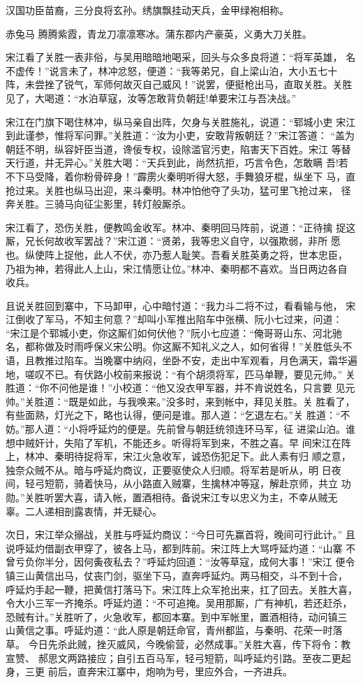 汉国功臣苗裔，三分良将玄孙。绣旗飘挂动天兵，金甲绿袍相称。

赤兔马
腾腾紫霞，青龙刀凛凛寒冰。蒲东郡内产豪英，义勇大刀关胜。

宋江看了关胜一表非俗，与吴用暗暗地喝采，回头与众多良将道：“将军英雄，
名不虚传！”说言未了，林冲忿怒，便道：“我等弟兄，自上梁山泊，大小五七十
阵，未尝挫了锐气，军师何故灭自己威风！”说罢，便挺枪出马，直取关胜。关胜
见了，大喝道：“水泊草寇，汝等怎敢背负朝廷!单要宋江与吾决战。”

宋江在门旗下喝住林冲，纵马亲自出阵，欠身与关胜施礼，说道：“郓城小吏
宋江到此谨参，惟将军问罪。”关胜道：“汝为小吏，安敢背叛朝廷？”宋江答道：
“盖为朝廷不明，纵容奸臣当道，谗佞专权，设除滥官污吏，陷害天下百姓。宋江
等替天行道，并无异心。”关胜大喝：“天兵到此，尚然抗拒，巧言令色，怎敢瞒
吾!若不下马受降，着你粉骨碎身！”霹雳火秦明听得大怒，手舞狼牙棍，纵坐下
马，直抢过来。关胜也纵马出迎，来斗秦明。林冲怕他夺了头功，猛可里飞抢过来，
径奔关胜。三骑马向征尘影里，转灯般厮杀。

宋江看了，恐伤关胜，便教鸣金收军。林冲、秦明回马阵前，说道：“正待擒
捉这厮，兄长何故收军罢战？”宋江道：“贤弟，我等忠义自守，以强欺弱，非所
愿也。纵使阵上捉他，此人不伏，亦乃惹人耻笑。吾看关胜英勇之将，世本忠臣，
乃祖为神，若得此人上山，宋江情愿让位。”林冲、秦明都不喜欢。当日两边各自
收兵。

且说关胜回到寨中，下马卸甲，心中暗忖道：“我力斗二将不过，看看输与他，
宋江倒收了军马，不知主何意？”却叫小军推出陷车中张横、阮小七过来，问道：
“宋江是个郓城小吏，你这厮们如何伏他？”阮小七应道：“俺哥哥山东、河北驰
名，都称做及时雨呼保义宋公明。你这厮不知礼义之人，如何省得！”关胜低头不
语，且教推过陷车。当晚寨中纳闷，坐卧不安，走出中军观看，月色满天，霜华遍
地，嗟叹不已。有伏路小校前来报说：“有个胡须将军，匹马单鞭，要见元帅。”
关胜道：“你不问他是谁！”小校道：“他又没衣甲军器，并不肯说姓名，只言要
见元帅。”关胜道：“既是如此，与我唤来。”没多时，来到帐中，拜见关胜。关
胜看了，有些面熟，灯光之下，略也认得，便问是谁。那人道：“乞退左右。”关
胜道：“不妨。”那人道：“小将呼延灼的便是。先前曾与朝廷统领连环马军，征
进梁山泊。谁想中贼奸计，失陷了军机，不能还乡。听得将军到来，不胜之喜。早
间宋江在阵上，林冲、秦明待捉将军，宋江火急收军，诚恐伤犯足下。此人素有归
顺之意，独奈众贼不从。暗与呼延灼商议，正要驱使众人归顺。将军若是听从，明
日夜间，轻弓短箭，骑着快马，从小路直入贼寨，生擒林冲等寇，解赴京师，共立
功勋。”关胜听罢大喜，请入帐，置酒相待。备说宋江专以忠义为主，不幸从贼无
辜。二人递相剖露衷情，并无疑心。

次日，宋江举众搦战，关胜与呼延灼商议：“今日可先赢首将，晚间可行此计。”
且说呼延灼借副衣甲穿了，彼各上马，都到阵前。宋江阵上大骂呼延灼道：“山寨
不曾亏负你半分，因何夤夜私去？”呼延灼回道：“汝等草寇，成何大事！”宋江
便令镇三山黄信出马，仗丧门剑，驱坐下马，直奔呼延灼。两马相交，斗不到十合，
呼延灼手起一鞭，把黄信打落马下。宋江阵上众军抢出来，扛了回去。关胜大喜，
令大小三军一齐掩杀。呼延灼道：“不可追掩。吴用那厮，广有神机，若还赶杀，
恐贼有计。”关胜听了，火急收军，都回本寨。到中军帐里，置酒相待，动问镇三
山黄信之事。呼延灼道：“此人原是朝廷命官，青州都监，与秦明、花荣一时落草。
今日先杀此贼，挫灭威风，今晚偷营，必然成事。”关胜大喜，传下将令：教宣赞、
郝思文两路接应；自引五百马军，轻弓短箭，叫呼延灼引路。至夜二更起身，三更
前后，直奔宋江寨中，炮响为号，里应外合，一齐进兵。

